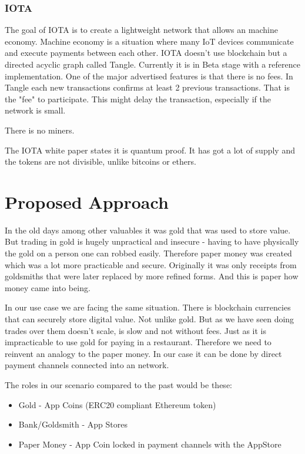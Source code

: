 \subsubsection{IOTA}
The goal of IOTA is to create a lightweight network that allows an machine economy. Machine economy is a situation where many IoT devices communicate and execute payments between each other. IOTA doesn't use blockchain but a directed acyclic graph called Tangle. Currently it is in Beta stage with a reference implementation. One of the major advertised features is that there is no fees. In Tangle each new transactions confirms at least 2 previous transactions. That is the "fee" to participate. This might delay the transaction, especially if the network is small. 

There is no miners.

The IOTA white paper states it is quantum proof. It has got a lot of supply and the tokens are not divisible, unlike bitcoins or ethers.

\section{Proposed Approach}
In the old days among other valuables it was gold that was used to store value. But trading in gold is hugely unpractical and insecure - having to have physically the gold on a person one can robbed easily. Therefore paper money was created which was a lot more practicable and secure. Originally it was only receipts from goldsmiths that were later replaced by more refined forms. And this is paper how money came into being.

In our use case we are facing the same situation. There is blockchain currencies that can securely store digital value. Not unlike gold. But as we have seen doing trades over them doesn't scale, is slow and not without fees. Just as it is impracticable to use gold for paying in a restaurant. Therefore we need to reinvent an analogy to the paper money. In our case it can be done by direct payment channels connected into an network.

The roles in our scenario compared to the past would be these:

\begin{itemize}
    \item Gold - App Coins (ERC20 compliant Ethereum token)
    \item Bank/Goldsmith - App Stores
    \item Paper Money - App Coin locked in payment channels with the AppStore
\end{itemize}


